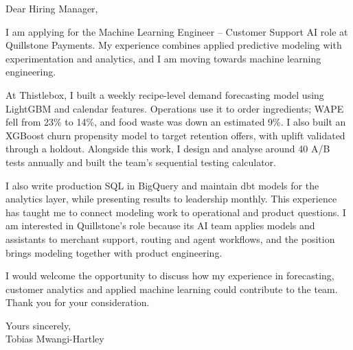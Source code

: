 \documentclass[11pt,a4paper]{article}
\begin{document}
Dear Hiring Manager,

I am applying for the Machine Learning Engineer – Customer Support AI role at Quillstone Payments. My experience combines applied predictive modeling with experimentation and analytics, and I am moving towards machine learning engineering.

At Thistlebox, I built a weekly recipe-level demand forecasting model using LightGBM and calendar features. Operations use it to order ingredients; WAPE fell from 23\% to 14\%, and food waste was down an estimated 9\%. I also built an XGBoost churn propensity model to target retention offers, with uplift validated through a holdout. Alongside this work, I design and analyse around 40 A/B tests annually and built the team's sequential testing calculator.

I also write production SQL in BigQuery and maintain dbt models for the analytics layer, while presenting results to leadership monthly. This experience has taught me to connect modeling work to operational and product questions. I am interested in Quillstone's role because its AI team applies models and assistants to merchant support, routing and agent workflows, and the position brings modeling together with product engineering.

I would welcome the opportunity to discuss how my experience in forecasting, customer analytics and applied machine learning could contribute to the team. Thank you for your consideration.

Yours sincerely,\\
Tobias Mwangi-Hartley
\end{document}
